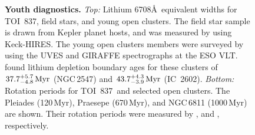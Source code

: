 \documentclass[12pt,twocolumn,tighten]{aastex63}
\newcommand{\tn}{TOI~837} %
\newcommand{\cn}{IC~2602} %
\begin{document}
\begin{figure}[!t]
	\begin{center}
		\leavevmode
		
		\vspace{-0.5cm}
	\end{center}
	\vspace{-0.7cm}
	\caption{ {\bf Youth diagnostics.}
    {\it Top:} Lithium 6708\AA\ equivalent widths for \tn, field
    stars, and young open clusters.  The field star sample is drawn
    from Kepler planet hosts, and was measured by
    \citet{berger_identifying_2018} using Keck-HIRES.  The young open
    clusters members were surveyed by \citet{randich_gaiaeso_2018}
    using the UVES and GIRAFFE spectrographs at the ESO VLT.
    \citet{randich_gaiaeso_2018} found lithium depletion boundary ages
    for these clusters of $37.7^{+5.7}_{-4.8}\,{\rm Myr}$
    (NGC$\,$2547) and $43.7^{+4.3}_{-3.9}\,{\rm Myr}$ (\cn).  {\it
    Bottom:} Rotation periods for \tn\ and selected open clusters.
    The Pleiades (120$\,$Myr), Praesepe (670$\,$Myr), and NGC$\,$6811
    (1000$\,$Myr) are shown.  Their rotation periods were measured by
    \citet{rebull_rotation_2016a,douglas_poking_2017,douglas_k2_2019},
    and \citet{curtis_temporary_2019}, respectively.
    \label{fig:lithium_rotation}
	}
\end{figure}





\end{document}

